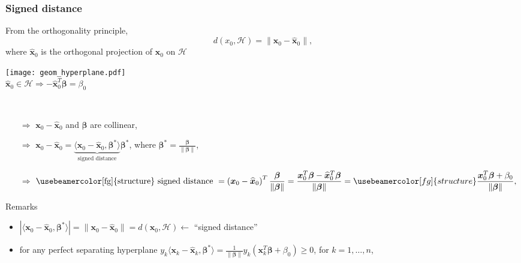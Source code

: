\documentclass[compress, smaller, serif, 9pt]{beamer}
\newcommand{\structuretext}[1]{{\usebeamercolor[fg]{structure} #1}}
\newcommand{\bx}{{\boldsymbol{x}}}
\newcommand{\bbeta}{{\boldsymbol{\beta}}}
\begin{document}
  
  \begin{frame}
   \frametitle{Signed distance}
   \medskip
   
  \begin{minipage}{.65\textwidth}
  From the orthogonality principle, 
  $$d(x_0,\mathcal{H})=\left\|  \boldsymbol{x}_0 - \widehat{\boldsymbol{x}}_0 \right\|,$$
  where $\widehat{\boldsymbol{x}}_0$ is the orthogonal projection of $\boldsymbol{x}_0$ on $\mathcal{H}$
\end{minipage}
\hfill
 \begin{minipage}{.3\textwidth}
  \begin{center}
   \texttt{[image: geom\_hyperplane.pdf]}\\
    $\widehat{\bx}_0 \in \mathcal{H} \Rightarrow - \widehat{\bx}_0^T\bbeta=\beta_0$
  \end{center}
 \end{minipage} \bigskip \\
 \begin{itemize}
  \item[$\Rightarrow$] $\boldsymbol{x}_0 - \widehat{\boldsymbol{x}}_0$ and  $\boldsymbol{\beta}$ are collinear,
   \item[$\Rightarrow$] $\boldsymbol{x}_0 - \widehat{\boldsymbol{x}}_0= \underbrace{\langle \bx_0 - \widehat{\bx}_0, \bbeta^{*} \rangle}_{\textrm{signed distance}} \bbeta^{*}$, where $ \bbeta^{*}= \frac{\bbeta}{\|\bbeta\|}$, %
    \item[$\Rightarrow$] $\begin{displaystyle}
    \textrm{\structuretext{signed distance} }= \left( \bx_0 - \widehat{\bx}_0\right)^T \frac{\bbeta}{\|\bbeta\|}= 
    \frac{\bx_0^T \bbeta - \widehat{\bx}_0^T \bbeta}{\|\bbeta\|}= \structuretext{\frac{\bx_0^T \bbeta +\beta_0}{\|\bbeta\|}},\end{displaystyle}$ 
 \end{itemize}
\begin{block}{Remarks}
  \begin{itemize}
    \item %
    $|\langle \bx_0 - \widehat{\bx}_0, \bbeta^{*} \rangle|= \| \bx_0 - \widehat{\bx}_0 \|= d(\bx_0,\mathcal{H}) \leftarrow$  ``signed distance''
    \item for any perfect separating hyperplane $y_k \langle \bx_k - \widehat{\bx}_k, \bbeta^{*} \rangle= \frac{1}{\|\bbeta\|} y_k ( \bx_k^T \bbeta +\beta_0)  \ge 0$, for $k=1,\ldots,n$, 
 \end{itemize}
     \end{block}
  \end{frame}    
  
\end{document}
